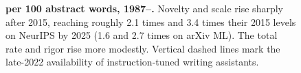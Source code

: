 \begin{figure}[htbp]
\vspace{2mm}

\caption{\textbf{ per 100
  abstract words, 1987--.}
  Novelty and scale rise sharply after 2015, reaching roughly
  2.1 times and 3.4 times their 2015 levels on NeurIPS by 2025
  (1.6 and 2.7 times on arXiv ML). The total rate and rigor rise
  more modestly. Vertical
  dashed lines mark the late-2022 availability of
  instruction-tuned writing assistants.}
\label{fig:app-sensational}
\end{figure}
